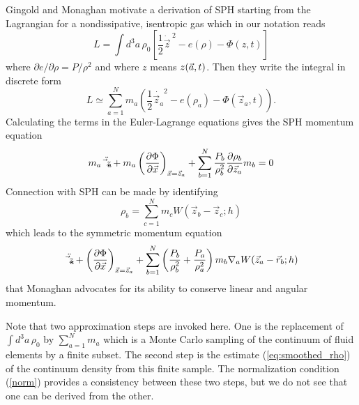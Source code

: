 Gingold and Monaghan motivate a derivation of SPH starting from the
Lagrangian for a nondissipative, isentropic gas which in our notation
reads
    \begin{equation}
    L = \int\!\! d^3a\,\rho_0 \left[ \frac{1}{2} {\dot {\vec z}\,}^2 -
        e(\rho) - \Phi(z,t)\right] 
    \end{equation}
where ${\partial e}/{\partial \rho} = {P}/{\rho^2}$ and where $z$
means $z({\vec a},t)$.  Then they write the integral in discrete form
    \begin{equation}
    L \simeq \sum_{a=1}^{N} m_a \left( \frac{1}{2} {\dot {\vec z_a}}^2 -
    e(\rho_a)  - \Phi(\vec z_a, t) \right) .
    \end{equation}
Calculating the terms in the Euler-Lagrange equations gives the SPH
momentum equation
    \begin{equation}
    m_a \ddot {\vec z_a}  + m_a \left( \frac{\partial \Phi}{\partial
                                    {\vec x}} \right)_{{\vec x} = {\vec z}_a}
    + \sum_{b=1}^{N} \frac{P_b}{\rho_b^2}
    \frac{\partial \rho_b}{\partial {\vec z_a}} m_b 
    = 0
    \end{equation}
Connection with SPH can be made by identifying 
    \begin{equation}\label{eq:smoothed_rho}
    \rho_b = \sum_{c=1}^{N} m_c W ( {\vec z_b} - {\vec z_c}; h )
    \end{equation}
which leads to the symmetric momentum equation
    \begin{equation}
    {\ddot {\vec z_a}}  + \left( \frac{\partial \Phi}{\partial
                                    {\vec x}} \right)_{{\vec x} = {\vec z}_a}
    + \sum_{b=1}^{N} \left( \frac{P_b}{\rho_b^2} +
    \frac{P_a}{\rho_a^2} \right) m_b \nabla_a W ( {\vec z_a} - {\vec
    r_b}; h )
    \end{equation} 
that Monaghan advocates for its ability to conserve linear and angular
momentum.

Note that two approximation steps are invoked here.  One is the
replacement of $\int\!\! d^3a\,\rho_0$ by $\sum_{a=1}^N m_a$ which is a
Monte Carlo sampling of the continuum of fluid elements by a finite
subset.  The second step is the estimate (\ref{eq:smoothed_rho}) of
the continuum density from this finite sample.  The normalization
condition (\ref{norm}) provides a consistency between these two
steps, but we do not see that one can be derived from the other.
